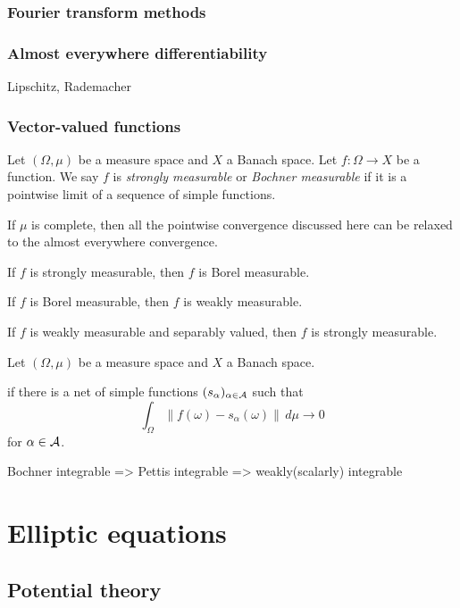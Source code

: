 \documentclass{../../large}
\begin{document}
\section{Fourier transform methods}
\section{Almost everywhere differentiability}
Lipschitz, Rademacher
\section{Vector-valued functions}


\begin{prb}
Let $(\Omega,\mu)$ be a measure space and $X$ a Banach space.
Let $f:\Omega\to X$ be a function.
We say $f$ is \emph{strongly measurable} or \emph{Bochner measurable} if it is a pointwise limit of a sequence of simple functions.


If $\mu$ is complete, then all the pointwise convergence discussed here can be relaxed to the almost everywhere convergence.

\begin{parts}
\item If $f$ is strongly measurable, then $f$ is Borel measurable.
\item If $f$ is Borel measurable, then $f$ is weakly measurable.
\item If $f$ is weakly measurable and separably valued, then $f$ is strongly measurable.
\end{parts}
\end{prb}

\begin{prb}
Let $(\Omega,\mu)$ be a measure space and $X$ a Banach space.

if there is a net of simple functions $(s_\alpha)_{\alpha\in\mathcal{A}}$ such that
\[\int_\Omega\|f(\omega)-s_\alpha(\omega)\|\,d\mu\to0\]
for $\alpha\in\mathcal{A}$.

Bochner integrable => Pettis integrable => weakly(scalarly) integrable
\end{prb}






\part{Elliptic equations}


\chapter{Potential theory}
\end{document}
